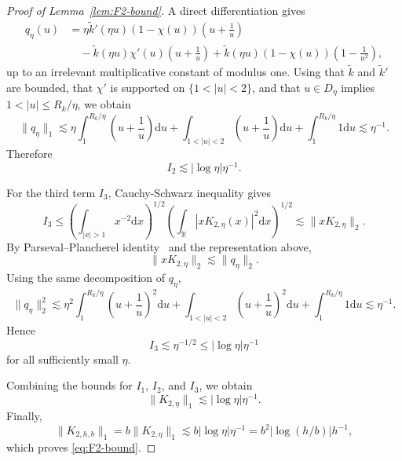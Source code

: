 \documentclass[english, 11pt]{article}
\newcommand{\mrd}{\mathrm{d}}
\newcommand{\FT}[1]{\widetilde{#1}}
\theoremstyle{plain}
\theoremstyle{definition}
\theoremstyle{remark}
\begin{document}
\begin{appendix}
\begin{proof}[Proof of Lemma~\ref{lem:F2-bound}]
A direct differentiation gives
\begin{align*}
q_\eta(u)
&=\eta \FT{k}'(\eta u)\left(1-\chi(u)\right)\left(u+\frac{1}{u}\right) \\
&\quad -\FT{k}(\eta u)\chi'(u)\left(u+\frac{1}{u}\right)+\FT{k}(\eta u)\left(1-\chi(u)\right)\left(1-\frac{1}{u^2}\right),
\end{align*}
up to an irrelevant multiplicative constant of modulus one. Using that $\FT{k}$ and $\FT{k}'$ are bounded, that $\chi'$ is supported on $\{1<|u|<2\}$, and that $u\in D_\eta$ implies $1<|u|\le R_k/\eta$, we obtain
\begin{equation*}
\|q_\eta\|_1\lesssim \eta\int_1^{R_k/\eta}\left(u+\frac{1}{u}\right)\mrd u + \int_{1<|u|<2}\left(u+\frac{1}{u}\right)\mrd u + \int_1^{R_k/\eta}1 \mrd u\lesssim \eta^{-1}.
\end{equation*}
Therefore
\begin{equation*}
I_2\lesssim |\log\eta| \eta^{-1}.
\end{equation*}

For the third term $I_3$, Cauchy-Schwarz inequality gives
\begin{equation*}
I_3\le\left(\int_{|x|>1}x^{-2} \mrd x\right)^{1/2}\left(\int_{\mathbb R}|xK_{2,\eta}(x)|^2 \mrd x\right)^{1/2}\lesssim \|xK_{2,\eta}\|_2.
\end{equation*}
By Parseval–Plancherel identity~\citep[Theorem 9.13]{rudin1974real} and the representation above,
\begin{equation*}
\|xK_{2,\eta}\|_2\lesssim \|q_\eta\|_2.
\end{equation*}
Using the same decomposition of $q_\eta$,
\begin{equation*}
\|q_\eta\|_2^2\lesssim \eta^2\int_1^{R_k/\eta}\left(u+\frac{1}{u}\right)^2 \mrd u + \int_{1<|u|<2}\left(u+\frac{1}{u}\right)^2 \mrd u + \int_1^{R_k/\eta}1 \mrd u\lesssim \eta^{-1}.
\end{equation*}
Hence
\begin{equation*}
I_3\lesssim \eta^{-1/2}\le |\log\eta| \eta^{-1}
\end{equation*}
for all sufficiently small $\eta$.

Combining the bounds for $I_1$, $I_2$, and $I_3$, we obtain
\begin{equation*}
\|K_{2,\eta}\|_1\lesssim |\log\eta| \eta^{-1}.
\end{equation*}
Finally,
\begin{equation*}
\|K_{2,h,b}\|_1 = b \|K_{2,\eta}\|_1\lesssim b |\log\eta| \eta^{-1} = b^2 |\log(h/b)| h^{-1},
\end{equation*}
which proves \eqref{eq:F2-bound}.
\end{proof}


\end{appendix}
\end{document}
